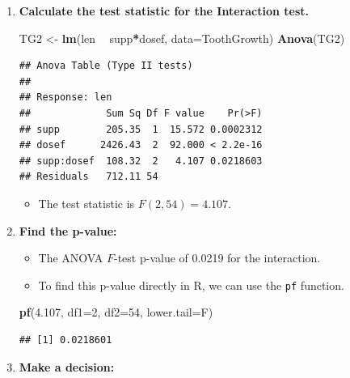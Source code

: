 \documentclass[]{book}
\newenvironment{Shaded}{\begin{snugshade}}{\end{snugshade}}
\newcommand{\KeywordTok}[1]{\textcolor[rgb]{0.13,0.29,0.53}{\textbf{#1}}}
\newcommand{\DataTypeTok}[1]{\textcolor[rgb]{0.13,0.29,0.53}{#1}}
\newcommand{\DecValTok}[1]{\textcolor[rgb]{0.00,0.00,0.81}{#1}}
\newcommand{\FloatTok}[1]{\textcolor[rgb]{0.00,0.00,0.81}{#1}}
\newcommand{\StringTok}[1]{\textcolor[rgb]{0.31,0.60,0.02}{#1}}
\newcommand{\OperatorTok}[1]{\textcolor[rgb]{0.81,0.36,0.00}{\textbf{#1}}}
\newcommand{\NormalTok}[1]{#1}
\providecommand{\tightlist}{%
  \setlength{\itemsep}{0pt}\setlength{\parskip}{0pt}}
\theoremstyle{definition}
\theoremstyle{definition}
\theoremstyle{remark}
\begin{document}
\newpage

\begin{enumerate}
\def\labelenumi{\arabic{enumi}.}
\setcounter{enumi}{2}
\item
  \textbf{Calculate the test statistic for the Interaction test.}

\begin{Shaded}
\begin{Highlighting}[]
\NormalTok{TG2 <-}\StringTok{ }\KeywordTok{lm}\NormalTok{(len }\OperatorTok{~}\StringTok{ }\NormalTok{supp}\OperatorTok{*}\NormalTok{dosef, }\DataTypeTok{data=}\NormalTok{ToothGrowth)}
\KeywordTok{Anova}\NormalTok{(TG2) }
\end{Highlighting}
\end{Shaded}

\begin{verbatim}
## Anova Table (Type II tests)
## 
## Response: len
##             Sum Sq Df F value    Pr(>F)
## supp        205.35  1  15.572 0.0002312
## dosef      2426.43  2  92.000 < 2.2e-16
## supp:dosef  108.32  2   4.107 0.0218603
## Residuals   712.11 54
\end{verbatim}

  \begin{itemize}
  \tightlist
  \item
    The test statistic is \(F(2,54)=4.107\).
  \end{itemize}
\item
  \textbf{Find the p-value:}

  \begin{itemize}
  \item
    The ANOVA \(F\)-test p-value of 0.0219 for the interaction.
  \item
    To find this p-value directly in R, we can use the \texttt{pf}
    function.
  \end{itemize}

\begin{Shaded}
\begin{Highlighting}[]
\KeywordTok{pf}\NormalTok{(}\FloatTok{4.107}\NormalTok{, }\DataTypeTok{df1=}\DecValTok{2}\NormalTok{, }\DataTypeTok{df2=}\DecValTok{54}\NormalTok{, }\DataTypeTok{lower.tail=}\NormalTok{F)}
\end{Highlighting}
\end{Shaded}

\begin{verbatim}
## [1] 0.0218601
\end{verbatim}
\item
  \textbf{Make a decision:}


\end{enumerate}
\end{document}
